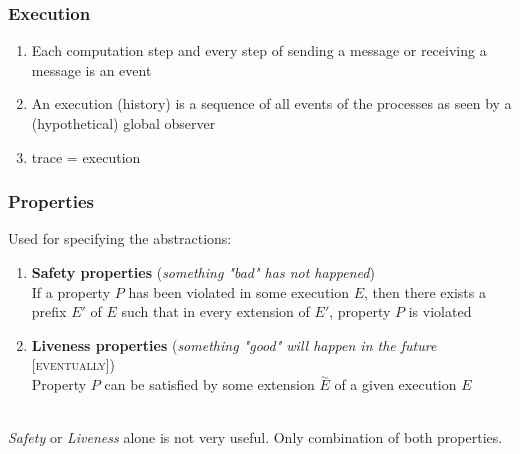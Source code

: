 \documentclass{article}
\begin{document}
\begin{adjustwidth}{2em}{2em}
\begin{adjustwidth}{2em}{2em}
			\subsubsection{Execution}
			\begin{adjustwidth}{2em}{}
				\begin{enumerate}[-]
					\item Each computation step and every step of sending a message or receiving a message is an event
					\item An execution (history) is a sequence of all events of the processes as seen by a (hypothetical) global observer
					\item trace = execution
				\end{enumerate}
			\end{adjustwidth}
			\subsubsection{Properties}
			\begin{adjustwidth}{2em}{}
				Used for specifying the abstractions: \\
				\begin{enumerate}[\footnotesize{\textbullet}]
					\item \textbf{Safety properties} (\textit{something "bad" has not happened}) \\
					If a property $P$ has been violated in some execution $E$, then there exists a prefix $E'$ of $E$ such that in every extension of $E'$, property $P$ is violated
					\item \textbf{Liveness properties} (\textit{something "good" will happen in the future} [\textsc{eventually}]) \\
					Property $P$ can be satisfied by some extension $\stackrel{\sim}{E}$ of a given execution $E$
				\end{enumerate}
				\hfill \\
				\textit{Safety} or \textit{Liveness} alone is not very useful. Only combination of both properties.
			\end{adjustwidth}

\end{adjustwidth}
\end{adjustwidth}
\end{document}
